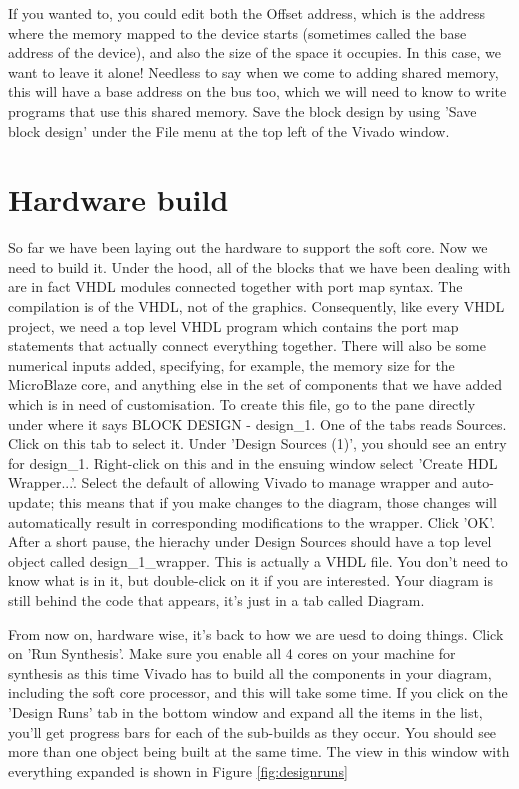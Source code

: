 \documentclass[../physical_computing.tex]{subfiles}
\begin{document}
If you wanted to, you could edit both the Offset address, 
which is the address where the memory mapped to the device starts (sometimes called the base address of the device), and also 
the size of the space it occupies. In this case, we want to leave it alone! Needless to say when we come to adding shared memory,
this will have a base address on the bus too, which we will need to know to write programs that use this shared memory.
Save the block design by using 'Save block design' under the File menu at the top left of the Vivado window.

\section{Hardware build}
\label{sec:hardwarebuild}

So far we have been laying out the hardware to support the soft core. Now we need to build it. Under the hood, all of the blocks 
that we have been dealing with are in fact VHDL modules connected together with port map syntax. The compilation is of the VHDL, 
not of the graphics. Consequently, like every VHDL project, we need a top level VHDL program which contains the port map statements
that actually connect everything together. There will also be some numerical inputs added, specifying, for example, the memory
size for the MicroBlaze core, and anything else in the set of components that we have added which is in need of customisation.
To create this file, go to the pane directly under where it says BLOCK DESIGN - design\_1. One of the tabs reads Sources. Click on
this tab to select it. Under 'Design Sources (1)', you should see an entry for design\_1. Right-click on this and in the ensuing 
window select 'Create HDL Wrapper...'. Select the default of allowing Vivado  to manage wrapper and auto-update; this means that if
you make changes to the diagram, those changes will automatically result in corresponding modifications to the wrapper. Click
'OK'. After a short pause, the hierachy under Design Sources should have a top level object called design\_1\_wrapper. This is
actually a VHDL file. You don't need to know what is in it, but double-click on it if you are interested. Your diagram is still behind
the code that appears, it's just in a tab called Diagram.

From now on, hardware wise, it's back to how we are uesd to doing things. Click on 'Run Synthesis'. Make sure you enable all 4 
cores on your machine for synthesis as this time Vivado has to build all the components in your diagram, including the soft core
processor, and this will take some time. If you click on the 'Design Runs' tab in the bottom window and expand all the items in 
the list, you'll get progress bars for each of the sub-builds as they occur. You should see more than one object being built
at the same time. The view in this window with everything expanded is shown in Figure \ref{fig:designruns}
\end{document}
